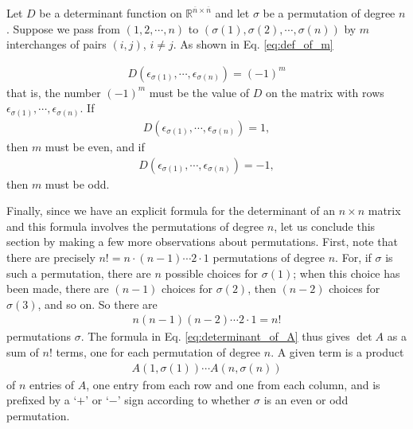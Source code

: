 \documentclass[12pt,letterpaper,reqno]{article}
\numberwithin{equation}{section}
\begin{document}
Let $D$ be a determinant function on $\mathbb{R}^{\overline{n} \times \overline{n}}$ and let $\sigma$ be a permutation of degree $n$. Suppose we pass from $(1,2,\cdots,n)$ to $(\sigma(1),\sigma(2),\cdots,\sigma(n))$ by $m$ interchanges of pairs $(i,j)$, $i\neq j$. As shown in Eq. \eqref{eq:def_of_m}

\begin{align*}
	D(\epsilon_{\sigma(1)},\cdots,\epsilon_{\sigma(n)})=(-1)^m
\end{align*}
that is, the number $(-1)^m$ must be the value of $D$ on the matrix with rows $\epsilon_{\sigma(1)},\cdots,\epsilon_{\sigma(n)}$. If 
\begin{align*}
	D(\epsilon_{\sigma(1)},\cdots,\epsilon_{\sigma(n)})=1,
\end{align*}
then $m$ must be even, and if 
\begin{align*}
	D(\epsilon_{\sigma(1)},\cdots,\epsilon_{\sigma(n)})=-1,
\end{align*}
then $m$ must be odd.

Finally, since we have an explicit formula for the determinant of an $n \times n$ matrix and this formula involves the permutations of degree $n$, let us conclude this section by making a few more observations about permutations. First, note that there are precisely $n!=n\cdot (n-1) \cdots 2 \cdot 1$ permutations of degree $n$. For, if $\sigma$ is such a permutation, there are $n$ possible choices for $\sigma(1)$; when this choice has been made, there are $(n-1)$ choices for $\sigma(2)$, then $(n-2)$ choices for $\sigma(3)$, and so on. So there are 
\begin{align*}
	n(n-1)(n-2) \cdots 2 \cdot 1=n!
\end{align*}
permutations $\sigma$. The formula in Eq. \eqref{eq:determinant_of_A} thus gives $\det A$ as a sum of $n!$ terms, one for each permutation of degree $n$. A given term is a product
\begin{align*}
	A(1,\sigma(1)) \cdots A(n,\sigma(n))
\end{align*}
of $n$ entries of $A$, one entry from each row and one from each column, and is prefixed by  a `$+$' or `$-$' sign according to whether $\sigma$ is an even or odd permutation.
\end{document}
